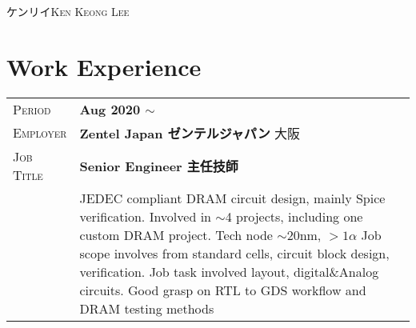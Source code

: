 \documentclass[a4paper, oneside, final]{scrartcl} %
\newcommand{\gray}{\rowcolor[gray]{.90}} %
\begin{document}
\begin{center} %


{\fontsize{24}{12}\selectfont\scshape ケンリイKen Keong Lee } %

\vspace{0.2cm} %



\section{Work Experience}

\begin{tabularx}{0.97\linewidth}{>{\raggedleft\scshape}p{2cm}X}
\gray Period & \textbf{Aug 2020 $\sim$}\\
\gray Employer & \textbf{Zentel Japan ゼンテルジャパン} \hfill 大阪\\
\gray Job Title & \textbf{Senior Engineer 主任技師}\\
& \footnotesize{JEDEC compliant DRAM circuit design, mainly Spice verification. Involved in $\sim$4 projects, including one custom DRAM project. Tech node $\sim$20nm, $> 1 \alpha$ Job scope involves from standard cells, circuit block design, verification. Job task involved layout, digital\&Analog circuits. Good grasp on RTL to GDS workflow and DRAM testing methods}
\end{tabularx}


\end{center}
\end{document}
